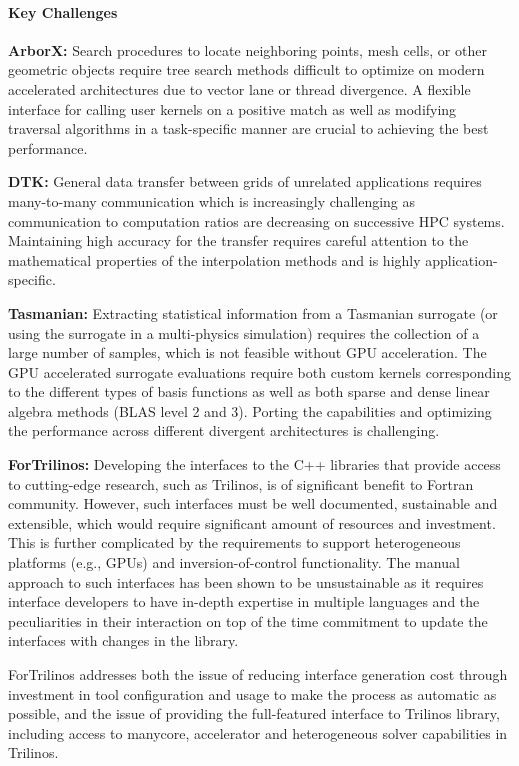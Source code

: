 \paragraph{Key Challenges}

\indent

{\bf ArborX:} Search procedures to locate neighboring points, mesh cells, or
other geometric objects require tree search methods difficult to optimize on
modern accelerated architectures due to vector lane or thread divergence. A
flexible interface for calling user kernels on a positive match as well as
modifying traversal algorithms in a task-specific manner are crucial to
achieving the best performance.

{\bf DTK:} General data transfer between grids of unrelated applications
requires many-to-many communication which is increasingly challenging as
communication to computation ratios are decreasing on successive HPC systems.
Maintaining high accuracy for the transfer requires careful attention to the
mathematical properties of the interpolation methods and is highly
application-specific.

{\bf Tasmanian:} Extracting statistical information from a Tasmanian surrogate
(or using the surrogate in a multi-physics simulation) requires the collection
of a large number of samples, which is not feasible without GPU acceleration.
The GPU accelerated surrogate evaluations require both custom kernels
corresponding to the different types of basis functions as well as both
sparse and dense linear algebra methods (BLAS level 2 and 3).
Porting the capabilities and optimizing the performance across different
divergent architectures is challenging.

{\bf ForTrilinos:}
Developing the interfaces to the C++ libraries that provide access to
cutting-edge research, such as Trilinos,  is of significant benefit to Fortran
community. However, such interfaces must be well documented, sustainable and
extensible, which would require significant amount of resources and investment.
This is further complicated by the requirements to support heterogeneous
platforms (e.g., GPUs) and inversion-of-control functionality. The manual
approach to such interfaces has been shown to be unsustainable as it requires
interface developers to have in-depth expertise in  multiple languages and the
peculiarities in their interaction on top of the time commitment to update the
interfaces with changes in the library.

ForTrilinos addresses both the issue of reducing interface generation cost
through investment in tool configuration and usage to make the process as
automatic as possible, and the issue of providing the full-featured interface to
Trilinos library, including access to manycore, accelerator and heterogeneous
solver capabilities in Trilinos.


